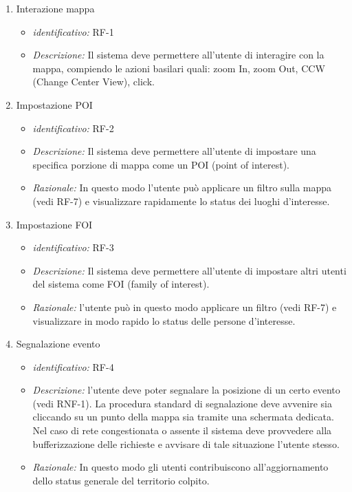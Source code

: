 \begin{enumerate}
\item Interazione mappa
  \begin{itemize}
     \item\textit{identificativo:} RF-1
  \item\textit{Descrizione:} Il sistema deve permettere all’utente di interagire con la mappa, compiendo le azioni basilari quali: zoom In, zoom Out, CCW (Change Center View), click.
  \end{itemize}
  
\item Impostazione POI
  \begin{itemize}
  \item\textit{identificativo:} RF-2
  \item\textit{Descrizione:} Il sistema deve permettere all’utente di impostare una specifica porzione di mappa come un POI (point of interest).
  \item\textit{ Razionale:} In questo modo l’utente può applicare un filtro sulla mappa (vedi RF-7)  e visualizzare rapidamente lo status dei luoghi d’interesse.
  \end{itemize}
  
\item Impostazione FOI
  \begin{itemize}
  \item\textit{identificativo:} RF-3
  \item\textit{Descrizione:} Il sistema deve permettere all’utente di impostare altri utenti del sistema come FOI (family of interest).
  \item\textit{ Razionale:} l’utente può in questo modo applicare un filtro (vedi RF-7) e visualizzare in modo rapido lo status delle persone d’interesse.
  \end{itemize}
  
  \item Segnalazione evento
  \begin{itemize}
  \item\textit{identificativo:} RF-4
  \item\textit{Descrizione:} l’utente deve poter segnalare la posizione di un certo evento (vedi RNF-1). 
La procedura standard di segnalazione deve avvenire sia cliccando su un punto della mappa sia tramite una schermata dedicata.
Nel caso di rete congestionata o assente il sistema deve provvedere alla bufferizzazione delle richieste e avvisare di tale situazione l’utente stesso.
  \item\textit{ Razionale:} In questo modo gli utenti contribuiscono all’aggiornamento dello status generale del territorio colpito.
  \end{itemize}
  

\end{enumerate}
